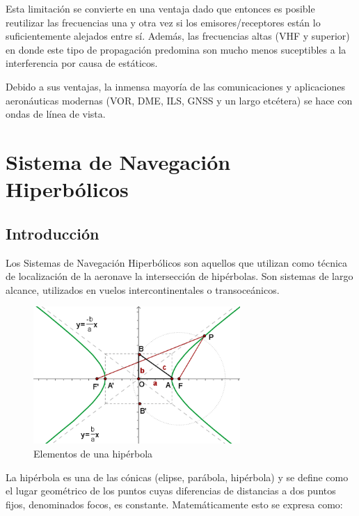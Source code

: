 \begin{description}
Esta limitaci\'on se convierte en una ventaja dado que entonces es posible reutilizar las frecuencias una y otra vez si los emisores/receptores est\'an lo suficientemente alejados entre s\'i. Adem\'as, las frecuencias altas (VHF y superior) en donde este tipo de propagaci\'on predomina son mucho menos suceptibles a la interferencia por causa de est\'aticos.

Debido a sus ventajas, la inmensa mayor\'ia de las comunicaciones y aplicaciones aeron\'auticas modernas (VOR, DME, ILS, GNSS y un largo etc\'etera) se hace con ondas de l\'inea de vista.

\end{description}

\section{Sistema de Navegaci\'on Hiperb\'olicos}

\subsection{Introducci\'on}

Los Sistemas de Navegaci\'on Hiperb\'olicos son aquellos que utilizan como t\'ecnica de localizaci\'on de la aeronave la intersecci\'on de hip\'erbolas. Son sistemas de largo alcance, utilizados en vuelos intercontinentales o transoce\'anicos.

\begin{figure}[!h]
  \centering
\includegraphics[width=0.7\textwidth]{Imagenes/06.01.adf/Hiperbola.gif}
  \caption{Elementos de una hip\'erbola}
  \label{fig:hiperbola}
  \label{!h}
\end{figure}


La hip\'erbola es una de las c\'onicas (elipse, par\'abola, hip\'erbola) y se define como el lugar geom\'etrico de los puntos cuyas diferencias de distancias a dos puntos fijos, denominados focos, es constante. Matem\'aticamente esto se expresa como:


